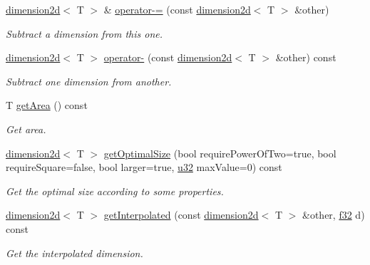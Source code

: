 \begin{DoxyCompactItemize}
\mbox{\label{classirr_1_1core_1_1dimension2d_af5bb67163a3cdbcbceb9eda015382bfe}} 
\hyperlink{classirr_1_1core_1_1dimension2d}{dimension2d}$<$ T $>$ \& \hyperlink{classirr_1_1core_1_1dimension2d_af5bb67163a3cdbcbceb9eda015382bfe}{operator-\/=} (const \hyperlink{classirr_1_1core_1_1dimension2d}{dimension2d}$<$ T $>$ \&other)
\begin{DoxyCompactList}\small\item\em Subtract a dimension from this one. \end{DoxyCompactList}\item 
\mbox{\label{classirr_1_1core_1_1dimension2d_aec5df4b45e5af7fa0fe13f2b0c6d5976}} 
\hyperlink{classirr_1_1core_1_1dimension2d}{dimension2d}$<$ T $>$ \hyperlink{classirr_1_1core_1_1dimension2d_aec5df4b45e5af7fa0fe13f2b0c6d5976}{operator-\/} (const \hyperlink{classirr_1_1core_1_1dimension2d}{dimension2d}$<$ T $>$ \&other) const
\begin{DoxyCompactList}\small\item\em Subtract one dimension from another. \end{DoxyCompactList}\item 
\mbox{\label{classirr_1_1core_1_1dimension2d_a320dee7a21500fd4625ab7660a33248b}} 
T \hyperlink{classirr_1_1core_1_1dimension2d_a320dee7a21500fd4625ab7660a33248b}{get\+Area} () const
\begin{DoxyCompactList}\small\item\em Get area. \end{DoxyCompactList}\item 
\hyperlink{classirr_1_1core_1_1dimension2d}{dimension2d}$<$ T $>$ \hyperlink{classirr_1_1core_1_1dimension2d_a5861f95f79fe5a23a0f2d867b6ca70fc}{get\+Optimal\+Size} (bool require\+Power\+Of\+Two=true, bool require\+Square=false, bool larger=true, \hyperlink{namespaceirr_a0416a53257075833e7002efd0a18e804}{u32} max\+Value=0) const
\begin{DoxyCompactList}\small\item\em Get the optimal size according to some properties. \end{DoxyCompactList}\item 
\hyperlink{classirr_1_1core_1_1dimension2d}{dimension2d}$<$ T $>$ \hyperlink{classirr_1_1core_1_1dimension2d_a30981123f90a2221acd85c1fe4364eee}{get\+Interpolated} (const \hyperlink{classirr_1_1core_1_1dimension2d}{dimension2d}$<$ T $>$ \&other, \hyperlink{namespaceirr_a0277be98d67dc26ff93b1a6a1d086b07}{f32} d) const
\begin{DoxyCompactList}\small\item\em Get the interpolated dimension. \end{DoxyCompactList}\end{DoxyCompactItemize}
